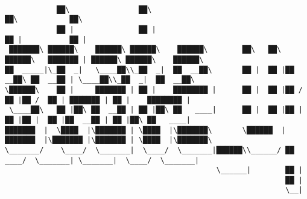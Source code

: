 \documentclass[varwidth=\maxdimen,margin=0.5cm,multi={verbatim}]{standalone}
\begin{document}
\begin{verbatim}

            ██\                ██\                                               ██\            ██\
            ██ |               ██ |                                              ██ |           ██ |
 ███████\ ██████\    ██████\ ██████\    ██████\        ██\   ██\  ██████\   ███████ | ██████\ ██████\    ██████\
██  _____|\_██  _|   \____██\\_██  _|  ██  __██\       ██ |  ██ |██  __██\ ██  __██ | \____██\\_██  _|  ██  __██\
\██████\    ██ |     ███████ | ██ |    ████████ |      ██ |  ██ |██ /  ██ |██ /  ██ | ███████ | ██ |    ████████ |
 \____██\   ██ |██\ ██  __██ | ██ |██\ ██   ____|      ██ |  ██ |██ |  ██ |██ |  ██ |██  __██ | ██ |██\ ██   ____|
███████  |  \████  |\███████ | \████  |\███████\       \██████  |███████  |\███████ |\███████ | \████  |\███████\
\_______/    \____/  \_______|  \____/  \_______|██████\\______/ ██  ____/  \_______| \_______|  \____/  \_______|
                                                 \______|        ██ |
                                                                 ██ |
                                                                 \__|



\end{verbatim}
\end{document}

